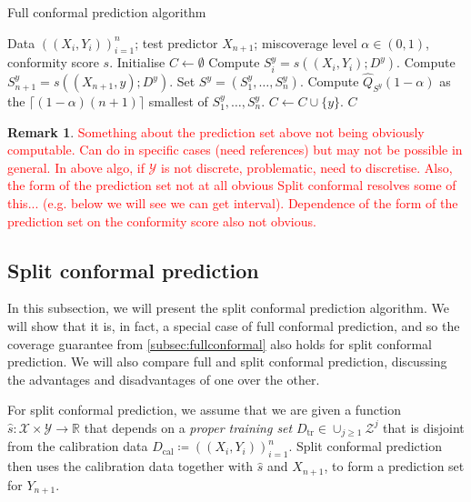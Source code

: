 \documentclass[11pt, titlepage]{article} %
\numberwithin{equation}{section}
\theoremstyle{definition}
\newtheorem{remark}{Remark}
\numberwithin{theorem}{section}
\numberwithin{lemma}{section}
\numberwithin{corollary}{section}
\numberwithin{proposition}{section}
\numberwithin{definition}{section}
\numberwithin{remark}{section}
\begin{document}
\begin{algorithm}[H]
\caption{Full conformal prediction algorithm}
\label{alg:fullconformal}
\begin{algorithmic}
    \Require Data \(((X_i, Y_i))_{i=1}^n\); test predictor \(X_{n+1}\); miscoverage level \(\alpha \in (0,1)\), conformity score \(s\).
    \State Initialise \(C \gets \emptyset\)
        \State Compute \(S_i^y = s((X_i, Y_i); D^y)\).
        \State Compute \(S_{n+1}^y = s((X_{n+1}, y); D^y)\).
        \State Set \(S^y = (S_1^y, \ldots, S_{n}^y)\).
        \State Compute \(\hat{Q}_{S^y}(1-\alpha)\) as the \(\lceil (1-\alpha)(n+1) \rceil \) smallest of \(S_1^y, \ldots, S_{n}^y\).
            \State \(C \gets C \cup \{y\} \).
        \EndIf
    \EndFor
    \Ensure \(C\)
\end{algorithmic}
\end{algorithm}

\begin{remark}
    \textcolor{red}{Something about the prediction set above not being obviously computable. Can do in specific cases (need references) but may not be possible in general. In above algo, if \(\mathcal{Y}\) is not discrete, problematic, need to discretise. Also, the form of the prediction set not at all obvious Split conformal resolves some of this... (e.g. below we will see we can get interval). Dependence of the form of the prediction set on the conformity score also not obvious.}
\end{remark}

\subsection{Split conformal prediction}
\label{subsec:splitconformal}

In this subsection, we will present the split conformal prediction algorithm. We will show that it is, in fact, a special case of full conformal prediction, and so the coverage guarantee from \cref{subsec:fullconformal} also holds for split conformal prediction. We will also compare full and split conformal prediction, discussing the advantages and disadvantages of one over the other.\vskip5pt

\noindent
For split conformal prediction, we assume that we are given a function \(\hat{s}:\mathcal{X} \times \mathcal{Y} \to \mathbb{R}\) that depends on a \textit{proper training set} \(D_\mathrm{tr} \in \cup_{j \geq 1} \mathcal{Z}^j \) that is disjoint from the calibration data \(D_\mathrm{cal} \coloneqq ((X_i, Y_i))_{i=1}^n\).  Split conformal prediction then uses the calibration data together with \(\hat{s}\) and \(X_{n+1}\), to form a prediction set for \(Y_{n+1}\). \vskip5pt
\end{document}
